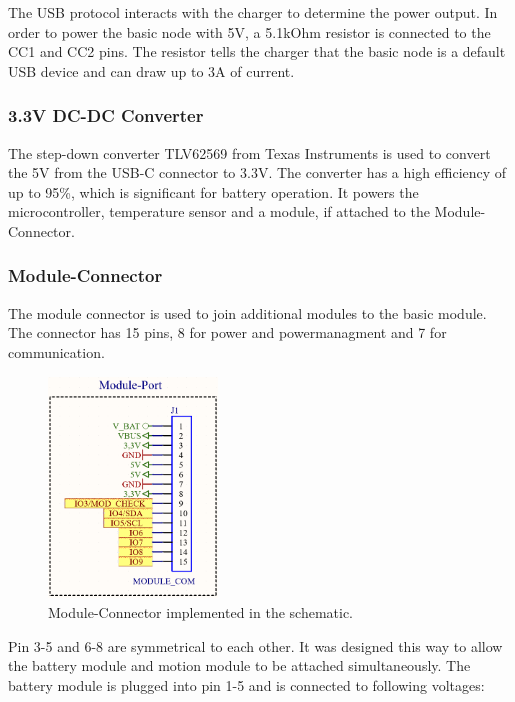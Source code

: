     The USB protocol interacts with the charger to determine the power output. In order to
    power the basic node with 5V, a 5.1kOhm resistor is connected to the CC1 and CC2 pins.
    The resistor tells the charger that the basic node is a default USB device and can draw
    up to 3A of current. 
    \cite{noauthor_fugen_2023}
    
    \subsubsection{3.3V DC-DC Converter}

    The  step-down converter TLV62569 from Texas Instruments is used to convert 
    the 5V from the USB-C connector to 3.3V. The converter has a high efficiency
    of up to 95\%, which is significant for battery operation. It powers the
    microcontroller, temperature sensor and a module, if attached to the
    Module-Connector.

    \subsubsection{Module-Connector}

    The module connector is used to join additional modules to the basic module.
    The connector has 15 pins, 8 for power and powermanagment and 7 for 
    communication. 

    \begin{figure}[H]
        \centering
        \includegraphics[width=0.4\textwidth]{assets/HW/Module-Connector-schematic.png}
        \caption{Module-Connector implemented in the schematic.}
    \end{figure}

    Pin 3-5 and 6-8 are symmetrical to each other. It was designed this way
    to allow the battery module and motion module to be attached simultaneously.
    The battery module is plugged into pin 1-5 and is connected to following 
    voltages:
    
